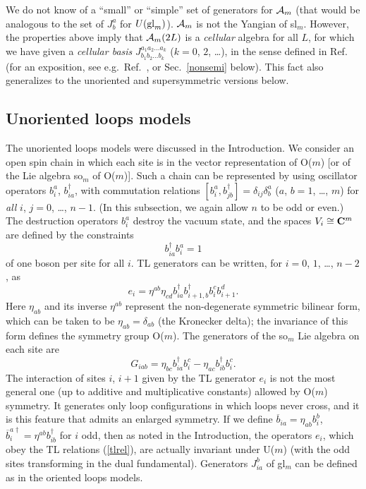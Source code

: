 \documentclass[twocolumn,floats,pra]{revtex4}
\def \cA {{\cal A}}
\newcommand {\be}{\begin{equation}}
\newcommand {\ee} {\end{equation}}
\begin{document}
We do not know of a ``small'' or ``simple'' set of generators for
$\cA_m$ (that would be analogous to the set of $J^a_b$ for $U({\rm
gl}_m)$). $\cA_m$ is not the Yangian of sl$_m$. However, the
properties above imply that $\cA_m(2L)$ is a {\em cellular}
algebra for all $L$, for which we have given a {\em cellular
basis} $J^{a_1a_2\ldots a_k}_{b_1b_2\ldots b_k}$ ($k=0$, $2$,
\ldots), in the sense defined in Ref.\ \cite{gl} (for an
exposition, see e.g.\ Ref.\ \cite{mathas}, or Sec.\ \ref{nonsemi}
below). This fact also generalizes to the unoriented and
supersymmetric versions below.


\subsection{Unoriented loops models}

The unoriented loops models \cite{nien} were discussed in the
Introduction. We consider an open spin chain in which each site is
in the vector representation of O($m$) [or of the Lie algebra
so$_m$ of O($m$)]. Such a chain can be represented by using
oscillator operators $b_i^a$, $b_{ia}^\dagger$, with commutation
relations $[b_i^a,b_{jb}^\dagger]= \delta_{ij}\delta_b^a$ ($a$,
$b=1$, \ldots, $m$)  for {\em all} $i$, $j=0$, \ldots, $n-1$. (In
this subsection, we again allow $n$ to be odd or even.) The
destruction operators $b_i^a$ destroy the vacuum state, and the
spaces $V_i\cong {\bf C}^m$ are defined by the constraints%
\be%
b_{ia}^\dagger b_i^a = 1 \ee%
of one boson per site for all $i$. TL generators can be written,
for $i=0$, $1$, \ldots, $n-2$, as%
\be%
e_i=\eta^{ab}\eta_{cd}b_{ia}^\dagger b_{i+1,b}^\dagger b_i^c
b_{i+1}^d.\ee%
Here $\eta_{ab}$ and its inverse $\eta^{ab}$ represent the
non-degenerate symmetric bilinear form, which can be taken to be
$\eta_{ab}=\delta_{ab}$ (the Kronecker delta); the invariance of
this form defines the symmetry group O($m$). The generators of the
so$_m$ Lie algebra on each site are %
\be%
G_{iab}=\eta_{bc}b_{ia}^\dagger b_i^c-\eta_{ac}b_{ib}^\dagger
b_i^c.\ee%
The interaction of sites $i$, $i+1$ given by the TL generator
$e_i$ is not the most general one (up to additive and
multiplicative constants) allowed by O($m$) symmetry. It generates
only loop configurations in which loops never cross, and it is
this feature that admits an enlarged symmetry. If we define
$\overline{b}_{ia}=\eta_{ab}b_i^b$,
$\overline{b}_i^{a\dagger}=\eta^{ab}b_{ib}^\dagger$ for $i$ odd,
then as noted in the Introduction, the operators $e_i$, which obey
the TL relations (\ref{tlrel}), are actually invariant under
U($m$) (with the odd sites transforming in the dual fundamental).
Generators $J_{ia}^b$ of gl$_m$ can be defined as in the oriented
loops models.
\end{document}
